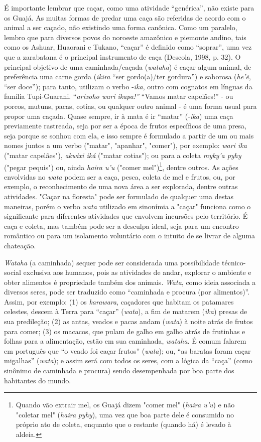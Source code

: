 É importante lembrar que caçar, como uma atividade ``genérica'', não
existe para os Guajá. As muitas formas de predar uma caça são referidas
de acordo com o animal a ser caçado, não existindo uma forma canônica.
Como um paralelo, lembro que para diversos povos do noroeste amazônico e
piemonte andino, tais como os Ashuar, Huaorani e Tukano, ``caçar'' é
definido como ``soprar'', uma vez que a zarabatana é o principal
instrumento de caça (Descola, 1998, p. 32). O principal objetivo de uma
caminhada/caçada (\emph{wataha}) é caçar algum animal, de preferência
uma carne gorda (\emph{ikira} ``ser gordo(a)/ter gordura'') e saborosa
(\emph{he'ẽ}, ``ser doce''); para tanto, utilizam o verbo -\emph{ika},
outro com cognatos em línguas da família Tupi-Guarani. ``\emph{arixoho
wari ikapa!''} ``Vamos matar capelães!'' - ou porcos, mutuns, pacas,
cotias, ou qualquer outro animal - é uma forma usual para propor uma
caçada. Quase sempre, ir à mata é ir ``matar'' (-\emph{ika}) uma caça
previamente rastreada, seja por ser a época de frutos específicos de uma
presa, seja porque se sonhou com ela, e isso sempre é formulado a partir
de um ou mais nomes juntos a um verbo ("matar", "apanhar", "comer"), por
exemplo: \emph{wari ika} ("matar capelães"), \emph{akwixi iká} ("matar
cotias"); ou para a coleta \emph{myky'a pyhy} ("pegar pequis") ou, ainda
\emph{haira u'u} ("comer mel")\footnote{Quando vão extrair mel, os Guajá
  dizem "comer mel" (\emph{haira u'u}) e não "coletar mel" (\emph{haira}
  \emph{pyhy}), uma vez que boa parte dele é consumido no próprio ato de
  coleta, enquanto que o restante (quando há) é levado à aldeia.},
dentre outros. As ações envolvidas no \emph{wata} podem ser a caça,
pesca, coleta de mel e frutos, ou, por exemplo, o reconhecimento de uma
nova área a ser explorada, dentre outras atividades. "Caçar na floresta"
pode ser formulado de qualquer uma destas maneiras, porém o verbo
\emph{wata} utilizado em sinonímia a "caçar" funciona como o
significante para diferentes atividades que envolvem incursões pelo
território. É caça e coleta, mas também pode ser a desculpa ideal, seja
para um encontro romântico ou para um isolamento voluntário com o
intuito de se livrar de alguma chateação.

\emph{Wataha} (a caminhada) sequer pode ser considerada uma
possibilidade técnico-social exclusiva aos humanos, pois as atividades
de andar, explorar o ambiente e obter alimentos é propriedade também dos
animais. \emph{Wata}, como ideia associada a diversos seres, pode ser
traduzido como ``caminhada e procura (por alimentos)''. Assim, por
exemplo: (1) os \emph{karawara}, caçadores que habitam os patamares
celestes, descem à Terra para ``caçar'' (\emph{wata}), a fim de matarem
(\emph{ika}) presas de sua predileção; (2) as antas, veados e pacas
andam (\emph{wata}) à noite atrás de frutos para comer; (3) os macacos,
que pulam de galho em galho atrás de frutinhas e folhas para a
alimentação, estão em sua caminhada, \emph{wataha}. É comum falarem em
português que ``o veado foi caçar frutos'' (\emph{wata}); ou, ``as
baratas foram caçar migalhas'' (\emph{wata}); e assim será com todos os
seres, com a lógica da ``caça'' (como sinônimo de caminhada e procura)
sendo desempenhada por boa parte dos habitantes do mundo.

